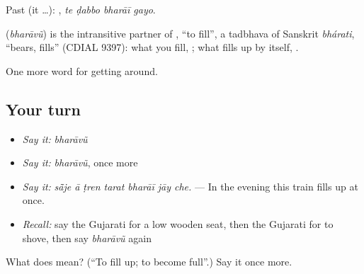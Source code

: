 Past (it …):    , \emph{te ḍabbo bharāī gayo}.

\begin{cousinweb}
\textbf{} (\emph{bharāvũ}) is the intransitive partner of , \textquotedblleft{}to fill\textquotedblright{}, a tadbhava of Sanskrit \emph{bhárati}, \textquotedblleft{}bears, fills\textquotedblright{} (CDIAL 9397): what you fill, ; what fills up by itself, .
\end{cousinweb}

\begin{grammarlens}[title={What you've built}]
One more word for getting around.
\end{grammarlens}

\subsection*{Your turn}
\begin{itemize}
\raggedright
  \item \emph{Say it:} \emph{bharāvũ}
  \item \emph{Say it:} \emph{bharāvũ}, once more
  \item \emph{Say it:} \emph{sā̃je ā ṭren tarat bharāī jāy che.} — In the evening this train fills up at once.
  \item \emph{Recall:} say the Gujarati for a low wooden seat, then the Gujarati for to shove, then say \emph{bharāvũ} again
\end{itemize}

\begin{tcolorbox}[breakable,colback=teal!4,colframe=teal!35!black,title={Before you move on}]
What does  mean? (\textquotedblleft{}To fill up; to become full\textquotedblright{}.) Say it once more.
\end{tcolorbox}

